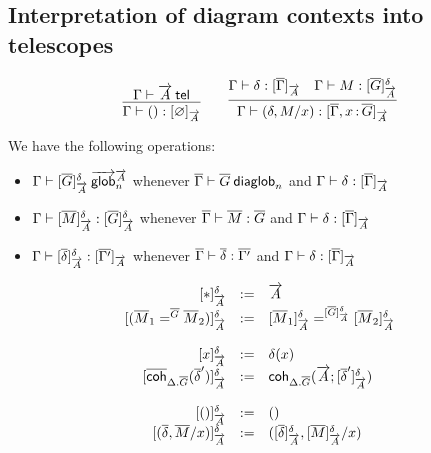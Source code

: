 \subsection{Interpretation of diagram contexts into telescopes}

\begin{small}
\[\infer
    {\ofinterp{\Gamma}{()}{\emptyctx}{\tel A}}
    {\wftel{\Gamma}{\tel A}}
  \qquad
  \infer
    {\ofinterp{\Gamma}{(\delta,M/x)}{\diag\Gamma,\tptm{x}{\diag G}}{\tel A}}
    {\ofinterp{\Gamma}{\delta}{\diag\Gamma}{\tel A}
    &\ofglob{\Gamma}{M}{\interpglob{\diag G}{\tel A}{\delta}}}
\]
\end{small}

We have the following operations:
\begin{itemize}
\item ${\Gamma} \vdash {[{\ensuremath{\overline{G}}}]_{\ensuremath{\overrightarrow{A}}}^{\delta}} \: \overrightarrow{\mathsf{glob}}^{\overrightarrow{A}}_{n}$ whenever
  ${\overline{\Gamma}} \vdash {\ensuremath{\overline{G}}} \: \mathsf{diaglob}_{n}$ and ${\Gamma} \vdash {\delta} : {[ \overline{\Gamma} ]_{\overrightarrow{A}}}$
\item ${\Gamma} \vdash {[{\ensuremath{\overline{M}}}]_{\ensuremath{\overrightarrow{A}}}^{\delta}} : {} {[{\overline{G}}]_{\overrightarrow{A}}^{\delta}}$ whenever ${\overline{\Gamma}} \vdash {\ensuremath{\overline{M}}} : {\overline{G}}$ and
  ${\Gamma} \vdash {\delta} : {[ \overline{\Gamma} ]_{\overrightarrow{A}}}$
\item ${\Gamma} \vdash {[{\ensuremath{\overline{\delta}}}]_{\ensuremath{\overrightarrow{A}}}^{\delta}} : {[ \overline{\Gamma'} ]_{\overrightarrow{A}}}$
  whenever ${\overline{\Gamma}} \vdash {\ensuremath{\overline{\delta}}} : {\overline{\Gamma'}}$ and
  ${\Gamma} \vdash {\delta} : {[ \overline{\Gamma} ]_{\overrightarrow{A}}}$
\end{itemize}

\begin{small}
  \[
  \begin{array}{rcl}
    \interpglob{\diagbase}{\tel A}{\delta} & := & \tel A \\
    \interpglob{(\homj{\diag G}{\diag M_1}{\diag M_2})}{\tel A}{\delta} & := &
    \homj{\interpglob{\diag G}{\tel A}{\delta}}
         {\interpglob{\diag M_1}{\tel A}{\delta}}
    {\interpglob{\diag M_2}{\tel A}{\delta}}\\\\

    \interpglob{x}{\tel A}{\delta} & := & \delta(x) \\
    \interpglob{\diagcoh{\Delta.\diag{G}}{\diag \delta'}}{\tel A}{\delta} & := &
    \coh{\Delta.\diag G}{\tel A}{\interpglob{\diag\delta'}{\tel A}{\delta}}\\\\

    \interpglob{()}{\tel A}{\delta} & := & () \\
    \interpglob{(\diag \delta,\diag M/x)}{\tel A}{\delta} & := &
    (\interpglob{\diag\delta}{\tel A}{\delta},\interpglob{\diag
    M}{\tel A}{\delta}/x)
  \end{array}
  \]
\end{small}















